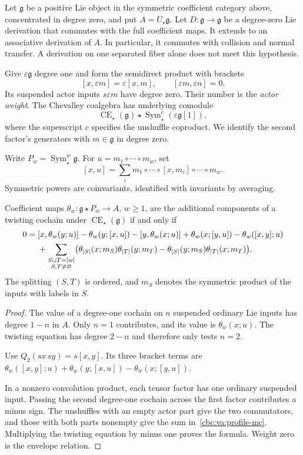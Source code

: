 Let $\mathfrak g$ be a positive Lie object in the
symmetric coefficient category above, concentrated in
degree zero, and put $A=U_\star\mathfrak g$.
Let $D:\mathfrak g\to\mathfrak g$ be a degree-zero Lie
derivation that commutes with the full coefficient
maps. It extends to an associative derivation of $A$.
In particular, it commutes with collision and normal
transfer. A derivation on one separated fiber alone
does not meet this hypothesis.

Give $\varepsilon\mathfrak g$ degree one and form the
semidirect product with brackets
\[
 [x,\varepsilon m]=\varepsilon[x,m],
 \qquad [\varepsilon m,\varepsilon n]=0.
\]
Its suspended actor inputs $s\varepsilon m$ have
degree zero. Their number is the \emph{actor weight}.
The Chevalley coalgebra has underlying comodule
\[
 \operatorname{CE}_\star(\mathfrak g)\star
 \operatorname{Sym}^c_\star(\varepsilon\mathfrak g[1]),
\]
where the superscript $c$ specifies the unshuffle
coproduct. We identify the second factor's generators
with $m\in\mathfrak g$ in degree zero.

Write $P_w=\operatorname{Sym}^w_\star\mathfrak g$.
For $u=m_1\circ\cdots\circ m_w$, set
\[
 [x,u]=\sum_i
 m_1\circ\cdots\circ[x,m_i]\circ\cdots\circ m_w.
\]
Symmetric powers are coinvariants, identified with
invariants by averaging.

\begin{lemma}\label{cbc:va:profile-equation}
Coefficient maps $\theta_w:\mathfrak g\star P_w\to A$,
$w\geq1$, are the additional components of a twisting
cochain under $\operatorname{CE}_\star(\mathfrak g)$
if and only if
\begin{align}
0={}&[x,\theta_w(y;u)]-\theta_w(y;[x,u])
      -[y,\theta_w(x;u)]+\theta_w(x;[y,u])
      -\theta_w([x,y];u)\notag\\
 &+\sum_{\substack{S\sqcup T=[w]\\S,T\ne\varnothing}}
 \bigl(\theta_{|S|}(x;m_S)\theta_{|T|}(y;m_T)
       -\theta_{|S|}(y;m_S)\theta_{|T|}(x;m_T)\bigr).
 \label{cbc:va:profile-mc}
\end{align}
The splitting $(S,T)$ is ordered, and $m_S$ denotes
the symmetric product of the inputs with labels in $S$.
\end{lemma}
\begin{proof}
The value of a degree-one cochain on $n$ suspended
ordinary Lie inputs has degree $1-n$ in $A$.
Only $n=1$ contributes, and its value is
$\theta_w(x;u)$. The twisting equation has degree
$2-n$ and therefore only tests $n=2$.

Use $Q_2(sx\,sy)=s[x,y]$. Its three bracket terms are
$\theta_w([x,y];u)+\theta_w(y;[x,u])
-\theta_w(x;[y,u])$.

In a nonzero convolution product, each tensor factor
has one ordinary suspended input. Passing the second
degree-one cochain across the first factor contributes
a minus sign. The unshuffles with an empty actor part
give the two commutators, and those with both parts
nonempty give the sum in~\eqref{cbc:va:profile-mc}.
Multiplying the twisting equation by minus one proves
the formula. Weight zero is the envelope relation.
\end{proof}

